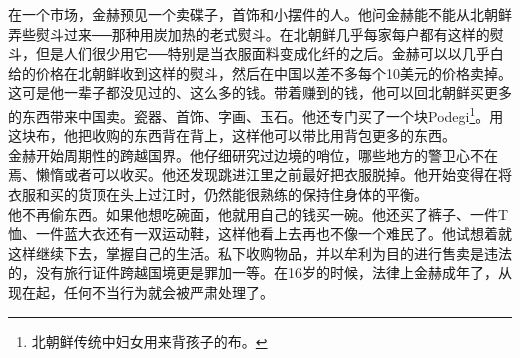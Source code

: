 在一个市场，金赫预见一个卖碟子，首饰和小摆件的人。他问金赫能不能从北朝鲜弄些熨斗过来──那种用炭加热的老式熨斗。在北朝鲜几乎每家每户都有这样的熨斗，但是人们很少用它──特别是当衣服面料变成化纤的之后。金赫可以以几乎白给的价格在北朝鲜收到这样的熨斗，然后在中国以差不多每个10美元的价格卖掉。这可是他一辈子都没见过的、这么多的钱。带着赚到的钱，他可以回北朝鲜买更多的东西带来中国卖。瓷器、首饰、字画、玉石。他还专门买了一个块Podegi\footnote{北朝鲜传统中妇女用来背孩子的布。}。用这块布，他把收购的东西背在背上，这样他可以带比用背包更多的东西。\\

金赫开始周期性的跨越国界。他仔细研究过边境的哨位，哪些地方的警卫心不在焉、懒惰或者可以收买。他还发现跳进江里之前最好把衣服脱掉。他开始变得在将衣服和买的货顶在头上过江时，仍然能很熟练的保持住身体的平衡。\\

他不再偷东西。如果他想吃碗面，他就用自己的钱买一碗。他还买了裤子、一件T恤、一件蓝大衣还有一双运动鞋，这样他看上去再也不像一个难民了。他试想着就这样继续下去，掌握自己的生活。私下收购物品，并以牟利为目的进行售卖是违法的，没有旅行证件跨越国境更是罪加一等。在16岁的时候，法律上金赫成年了，从现在起，任何不当行为就会被严肃处理了。\\
